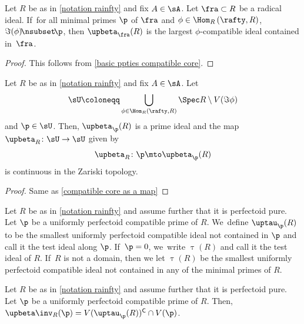\begin{proposition}
Let $R$ be as in \autoref{notation rainfty} and fix $A\in \sA$. Let $\fra\subset R$ be a radical ideal. If~for all minimal primes $\p$ of $\fra$ and $\phi\in \Hom_R\left(\rafty,R\right)$, $\Im(\phi)\!\nsubset\! \p$, then
$\upbeta_\fra(R)$ is the largest $\phi$-compatible ideal contained in~$\fra$.
\end{proposition}

\begin{proof}
This follows from \autoref{basic ppties compatible core}.
\end{proof}

\begin{proposition}
Let $R$ be as in \autoref{notation rainfty} and fix $A\in \sA$. Let
\[
\sU\coloneqq \bigcup_{\phi\in \Hom_R\left(\rafty,R\right)} \Spec R\setminus V(\Im\phi)
\]
and $\p\in \sU$.
Then, $\upbeta_\p(R)$ is a prime ideal and the map $\upbeta_{R}\colon \sU \to \sU$ given by
\[
\upbeta_{R}\colon \p \mto \upbeta_\p(R)
\]
is continuous in the Zariski topology.
\end{proposition}

\begin{proof}
Same as \autoref{compatible core as a map}
\end{proof}

\begin{definition}
Let $R$ be as in \autoref{notation rainfty} and assume further that it is perfectoid pure. Let $\p$ be a uniformly perfectoid compatible prime of $R$. We~define $\uptau_\p(R)$ to be the smallest uniformly perfectoid compatible ideal not contained in $\p$ and call it the test ideal along $\p$. If~$\p=0$, we~write $\uptau(R)$ and call it the test ideal of $R$. If~$R$ is not a domain, then we let $\uptau(R)$ be the smallest uniformly perfectoid compatible ideal not contained in any of the minimal primes of $R$.
\end{definition}

\begin{proposition}\label{fibers of beta are tau}
Let $R$ be as in \autoref{notation rainfty} and assume further that it is perfectoid pure. Let $\p$ be a uniformly perfectoid compatible prime of $R$. Then, $\upbeta\inv_{R}(\p)=V(\uptau_\p(R))^\mathsf{C}\cap V(\p)$.
\end{proposition}

